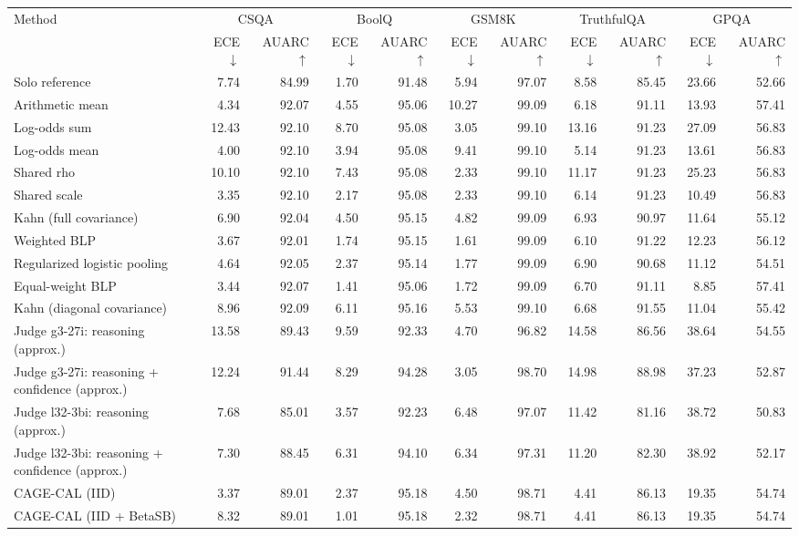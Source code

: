 \begin{tabular}{lrrrrrrrrrr}
\toprule
Method & \multicolumn{2}{c}{CSQA} & \multicolumn{2}{c}{BoolQ} & \multicolumn{2}{c}{GSM8K} & \multicolumn{2}{c}{TruthfulQA} & \multicolumn{2}{c}{GPQA} \\
 & ECE $\downarrow$ & AUARC $\uparrow$ & ECE $\downarrow$ & AUARC $\uparrow$ & ECE $\downarrow$ & AUARC $\uparrow$ & ECE $\downarrow$ & AUARC $\uparrow$ & ECE $\downarrow$ & AUARC $\uparrow$ \\
\midrule
Solo reference & 7.74 & 84.99 & 1.70 & 91.48 & 5.94 & 97.07 & 8.58 & 85.45 & 23.66 & 52.66 \\
Arithmetic mean & 4.34 & 92.07 & 4.55 & 95.06 & 10.27 & 99.09 & 6.18 & 91.11 & 13.93 & 57.41 \\
Log-odds sum & 12.43 & 92.10 & 8.70 & 95.08 & 3.05 & 99.10 & 13.16 & 91.23 & 27.09 & 56.83 \\
Log-odds mean & 4.00 & 92.10 & 3.94 & 95.08 & 9.41 & 99.10 & 5.14 & 91.23 & 13.61 & 56.83 \\
Shared rho & 10.10 & 92.10 & 7.43 & 95.08 & 2.33 & 99.10 & 11.17 & 91.23 & 25.23 & 56.83 \\
Shared scale & 3.35 & 92.10 & 2.17 & 95.08 & 2.33 & 99.10 & 6.14 & 91.23 & 10.49 & 56.83 \\
Kahn (full covariance) & 6.90 & 92.04 & 4.50 & 95.15 & 4.82 & 99.09 & 6.93 & 90.97 & 11.64 & 55.12 \\
Weighted BLP & 3.67 & 92.01 & 1.74 & 95.15 & 1.61 & 99.09 & 6.10 & 91.22 & 12.23 & 56.12 \\
Regularized logistic pooling & 4.64 & 92.05 & 2.37 & 95.14 & 1.77 & 99.09 & 6.90 & 90.68 & 11.12 & 54.51 \\
Equal-weight BLP & 3.44 & 92.07 & 1.41 & 95.06 & 1.72 & 99.09 & 6.70 & 91.11 & 8.85 & 57.41 \\
Kahn (diagonal covariance) & 8.96 & 92.09 & 6.11 & 95.16 & 5.53 & 99.10 & 6.68 & 91.55 & 11.04 & 55.42 \\
Judge g3-27i: reasoning (approx.) & 13.58 & 89.43 & 9.59 & 92.33 & 4.70 & 96.82 & 14.58 & 86.56 & 38.64 & 54.55 \\
Judge g3-27i: reasoning + confidence (approx.) & 12.24 & 91.44 & 8.29 & 94.28 & 3.05 & 98.70 & 14.98 & 88.98 & 37.23 & 52.87 \\
Judge l32-3bi: reasoning (approx.) & 7.68 & 85.01 & 3.57 & 92.23 & 6.48 & 97.07 & 11.42 & 81.16 & 38.72 & 50.83 \\
Judge l32-3bi: reasoning + confidence (approx.) & 7.30 & 88.45 & 6.31 & 94.10 & 6.34 & 97.31 & 11.20 & 82.30 & 38.92 & 52.17 \\
CAGE-CAL (IID) & 3.37 & 89.01 & 2.37 & 95.18 & 4.50 & 98.71 & 4.41 & 86.13 & 19.35 & 54.74 \\
CAGE-CAL (IID + BetaSB) & 8.32 & 89.01 & 1.01 & 95.18 & 2.32 & 98.71 & 4.41 & 86.13 & 19.35 & 54.74 \\
\bottomrule
\end{tabular}
